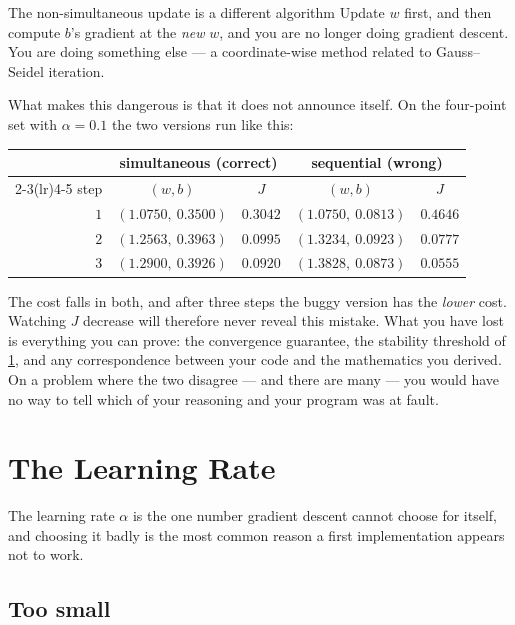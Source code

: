 \begin{pitfall}{The non-simultaneous update is a different algorithm}
Update $w$ first, and then compute $b$'s gradient at the \emph{new} $w$, and you
are no longer doing gradient descent. You are doing something else --- a
coordinate-wise method related to Gauss--Seidel iteration.

What makes this dangerous is that it does not announce itself. On the four-point
set with $\alpha=0.1$ the two versions run like this:

\begin{center}
\small
\begin{tabular}{@{}rcccc@{}}
\toprule
& \multicolumn{2}{c}{simultaneous (correct)} & \multicolumn{2}{c}{sequential (wrong)}\\
\cmidrule(lr){2-3}\cmidrule(lr){4-5}
step & $(w,b)$ & $J$ & $(w,b)$ & $J$\\
\midrule
$1$ & $(1.0750,\ 0.3500)$ & $0.3042$ & $(1.0750,\ 0.0813)$ & $0.4646$\\
$2$ & $(1.2563,\ 0.3963)$ & $0.0995$ & $(1.3234,\ 0.0923)$ & $0.0777$\\
$3$ & $(1.2900,\ 0.3926)$ & $0.0920$ & $(1.3828,\ 0.0873)$ & $0.0555$\\
\bottomrule
\end{tabular}
\end{center}

The cost falls in both, and after three steps the buggy version has the
\emph{lower} cost. Watching $J$ decrease will therefore never reveal this
mistake. What you have lost is everything you can prove: the convergence
guarantee, the stability threshold of \cref{sec:learning-rate}, and any
correspondence between your code and the mathematics you derived. On a
problem where the two disagree --- and there are many --- you would have no way
to tell which of your reasoning and your program was at fault.
\end{pitfall}

\section{The Learning Rate}
\label{sec:learning-rate}

The learning rate $\alpha$ is the one number gradient descent cannot choose for
itself, and choosing it badly is the most common reason a first implementation
appears not to work.

\subsection{Too small}

